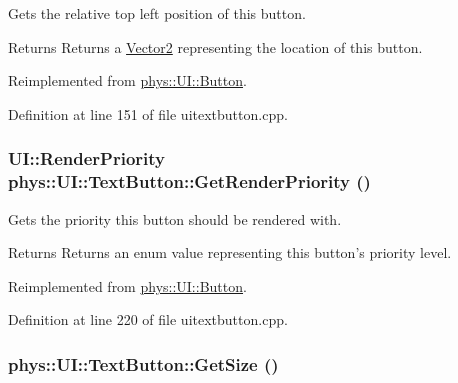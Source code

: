 Gets the relative top left position of this button. 

\begin{DoxyReturn}{Returns}
Returns a \hyperlink{classphys_1_1Vector2}{Vector2} representing the location of this button. 
\end{DoxyReturn}


Reimplemented from \hyperlink{classphys_1_1UI_1_1Button_adfa08ace813b88cae114e18f88942642}{phys::UI::Button}.



Definition at line 151 of file uitextbutton.cpp.

\hypertarget{classphys_1_1UI_1_1TextButton_ad339621af6e73ff9702c0dd4cdadbb73}{
\subsubsection[{GetRenderPriority}]{\setlength{\rightskip}{0pt plus 5cm}UI::RenderPriority phys::UI::TextButton::GetRenderPriority ()}}
\label{df/d03/classphys_1_1UI_1_1TextButton_ad339621af6e73ff9702c0dd4cdadbb73}


Gets the priority this button should be rendered with. 

\begin{DoxyReturn}{Returns}
Returns an enum value representing this button's priority level. 
\end{DoxyReturn}


Reimplemented from \hyperlink{classphys_1_1UI_1_1Button_aa17ffbc9b0d4eed151ff5ecbf93d88b8}{phys::UI::Button}.



Definition at line 220 of file uitextbutton.cpp.

\hypertarget{classphys_1_1UI_1_1TextButton_a21f1ff24070711e5a42eae4eb54d02d6}{
\subsubsection[{GetSize}]{ phys::UI::TextButton::GetSize ()}}
\label{df/d03/classphys_1_1UI_1_1TextButton_a21f1ff24070711e5a42eae4eb54d02d6}


